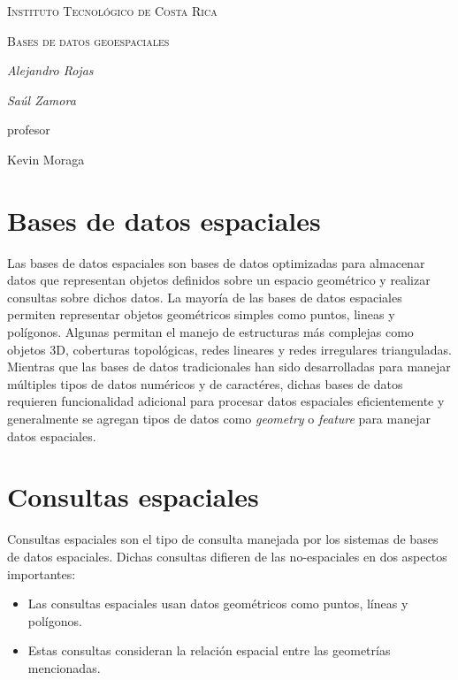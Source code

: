 \documentclass{article}
\begin{document}
\begin{titlepage}
  \centering
  {\scshape\LARGE Instituto Tecnol\'ogico de Costa Rica \par}
  \vspace{1cm}
  {\scshape\Large Bases de datos geoespaciales\par}
  \vspace{1.5cm}
  {\Large\itshape Alejandro Rojas\par}
  {\Large\itshape Sa\'ul Zamora\par}
  \vfill
  profesor\par
  Kevin Moraga \textsc{}

  \vfill

\end{titlepage}

\section{Bases de datos espaciales}
Las bases de datos espaciales son bases de datos optimizadas para almacenar datos que representan objetos definidos sobre un espacio geom\'etrico y realizar consultas sobre dichos datos. La mayor\'ia de las bases de datos espaciales permiten representar objetos geom\'etricos simples como puntos, lineas y pol\'igonos. Algunas permitan el manejo de estructuras m\'as complejas como objetos 3D, coberturas topol\'ogicas, redes lineares y redes irregulares trianguladas.
Mientras que las bases de datos tradicionales han sido desarrolladas para manejar m\'ultiples tipos de datos num\'ericos y de caract\'eres, dichas bases de datos requieren funcionalidad adicional para procesar datos espaciales eficientemente y generalmente se agregan tipos de datos como \emph{geometry} o \emph{feature} para manejar datos espaciales.

\section{Consultas espaciales}
Consultas espaciales son el tipo de consulta manejada por los sistemas de bases de datos espaciales. Dichas consultas difieren de las no-espaciales en dos aspectos importantes:
\begin{itemize}
  \item Las consultas espaciales usan datos geom\'etricos como puntos, l\'ineas y pol\'igonos.
  \item Estas consultas consideran la relaci\'on espacial entre las geometr\'ias mencionadas.
\end{itemize}
\end{document}

